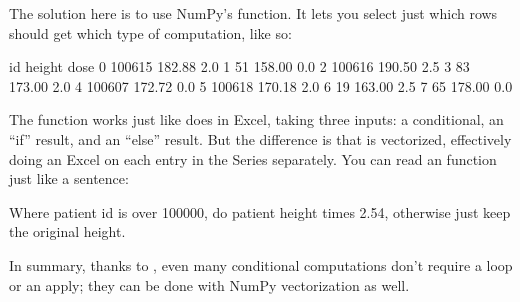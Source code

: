 \documentclass[letterpaper,10pt,english]{jupyterBook}
\begin{document}
\sphinxAtStartPar
The solution here is to use NumPy’s  function.  It lets you select just which rows should get which type of computation, like so:

\begin{sphinxVerbatim}[commandchars=\\\{\}]
  

\PYG{p}{[}\PYG{p}{]}   \PYG{p}{[}\PYG{p}{]}   \PYG{p}{[}\PYG{p}{]}   \PYG{p}{[}\PYG{p}{]} 
\end{sphinxVerbatim}

\begin{sphinxVerbatim}[commandchars=\\\{\}]
       id  height  dose
0  100615  182.88   2.0
1      51  158.00   0.0
2  100616  190.50   2.5
3      83  173.00   2.0
4  100607  172.72   0.0
5  100618  170.18   2.0
6      19  163.00   2.5
7      65  178.00   0.0
\end{sphinxVerbatim}

\sphinxAtStartPar
The  function works just like  does in Excel, taking three inputs: a conditional, an “if” result, and an “else” result.  But the difference is that  is vectorized, effectively doing an Excel  on each entry in the Series separately.  You can read an  function just like a sentence:

\sphinxAtStartPar
Where patient id is over 100000, do patient height times 2.54, otherwise just keep the original height.

\sphinxAtStartPar
In summary, thanks to , even many conditional computations don’t require a loop or an apply; they can be done with NumPy vectorization as well.
\end{document}
